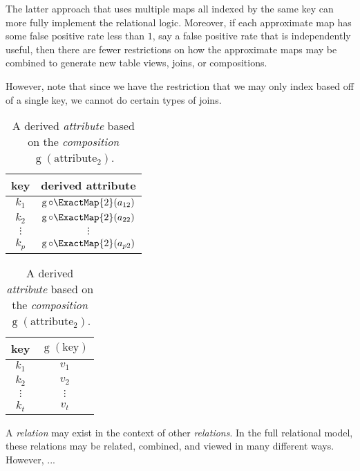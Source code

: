 \documentclass[ ../main.tex]{subfiles}
\begin{document}



The latter approach that uses multiple maps all indexed by the same key can more fully implement the relational logic. Moreover, if each approximate map has some false positive rate less than $1$, say a false positive rate that is independently useful, then there are fewer restrictions on how the approximate maps may be combined to generate new table views, joins, or compositions.

However, note that since we have the restriction that we may only index based off of a single key, we cannot do certain types of joins.


\begin{table}[h]
\centering
\caption{A derived \emph{attribute} based on the \emph{composition} $\operatorname{g}(\text{attribute$_2$})$.}
\label{tbl:relation_derived}
\begin{tabular}{|c c|} 
\hline
key & derived attribute\\
\hline
    $k_1$ & $\operatorname{g} \circ \ExactMap{2}(a_{1 2})$\\
    $k_2$ & $\operatorname{g} \circ \ExactMap{2}(a_{2 2})$\\
    $\vdots$ & $\vdots$\\
    $k_p$ & $\operatorname{g} \circ \ExactMap{2}(a_{p 2})$\\
\hline
\end{tabular}
\begin{tabular}{|c c|} 
\hline
key & $\operatorname{g}(\text{key})$\\
\hline
    $k_1$ & $v_1$\\
    $k_2$ & $v_2$\\
    $\vdots$ & $\vdots$\\
    $k_t$ & $v_t$\\
\hline
\end{tabular}
\end{table}


A \emph{relation} may exist in the context of other \emph{relations}. In the full relational model, these relations may be related, combined, and viewed in many different ways. However, ...
\end{document}
